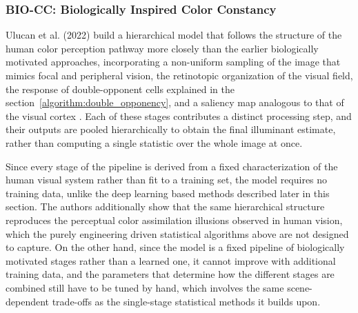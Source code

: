 \subsubsection{BIO-CC: Biologically Inspired Color Constancy}

Ulucan et al. (2022) build a hierarchical model that follows the structure of the human color perception pathway more closely than the earlier biologically motivated approaches, incorporating a non-uniform sampling of the image that mimics focal and peripheral vision, the retinotopic organization of the visual field, the response of double-opponent cells explained in the section~\ref{algorithm:double_opponency}, and a saliency map analogous to that of the visual cortex \cite{ulucan2022bio}. Each of these stages contributes a distinct processing step, and their outputs are pooled hierarchically to obtain the final illuminant estimate, rather than computing a single statistic over the whole image at once.

Since every stage of the pipeline is derived from a fixed characterization of the human visual system rather than fit to a training set, the model requires no training data, unlike the deep learning based methods described later in this section. The authors additionally show that the same hierarchical structure reproduces the perceptual color assimilation illusions observed in human vision, which the purely engineering driven statistical algorithms above are not designed to capture. On the other hand, since the model is a fixed pipeline of biologically motivated stages rather than a learned one, it cannot improve with additional training data, and the parameters that determine how the different stages are combined still have to be tuned by hand, which involves the same scene-dependent trade-offs as the single-stage statistical methods it builds upon.

